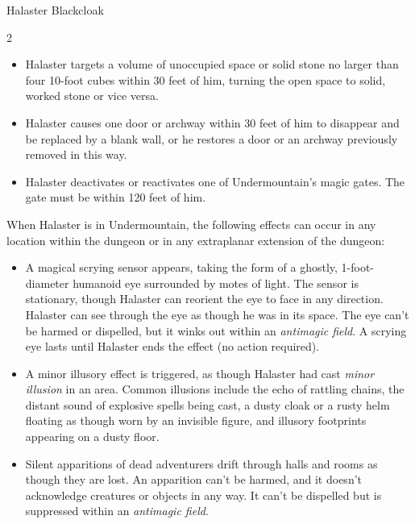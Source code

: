 \documentclass[10pt,a4paper,twoside,bg=print,twocolumn,openany,nodeprecatedcode]{dndbook}
\begin{document}
\begin{DndMonster}[float*=b,width=\textwidth + 8pt]{Halaster Blackcloak}
\begin{multicols}{2}
\begin{itemize}
\item Halaster targets a volume of unoccupied space or solid stone no larger than four 10-foot cubes within 30 feet of him, turning the open space to solid, worked stone or vice versa.
\item Halaster causes one door or archway within 30 feet of him to disappear and be replaced by a blank wall, or he restores a door or an archway previously removed in this way.
\item Halaster deactivates or reactivates one of Undermountain's magic gates. The gate must be within 120 feet of him.
\end{itemize}

When Halaster is in Undermountain, the following effects can occur in any location within the dungeon or in any extraplanar extension of the dungeon:


\begin{itemize}
\item A magical scrying sensor appears, taking the form of a ghostly, 1-foot-diameter humanoid eye surrounded by motes of light. The sensor is stationary, though Halaster can reorient the eye to face in any direction. Halaster can see through the eye as though he was in its space. The eye can't be harmed or dispelled, but it winks out within an \textit{antimagic field}. A scrying eye lasts until Halaster ends the effect (no action required).
\item A minor illusory effect is triggered, as though Halaster had cast \textit{minor illusion} in an area. Common illusions include the echo of rattling chains, the distant sound of explosive spells being cast, a dusty cloak or a rusty helm floating as though worn by an invisible figure, and illusory footprints appearing on a dusty floor.
\item Silent apparitions of dead adventurers drift through halls and rooms as though they are lost. An apparition can't be harmed, and it doesn't acknowledge creatures or objects in any way. It can't be dispelled but is suppressed within an \textit{antimagic field}.
\end{itemize}

\end{multicols}
\end{DndMonster}
\end{document}
